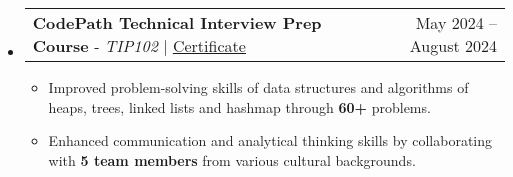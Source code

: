 \documentclass[letterpaper,11pt]{article}
\makeatletter
\newcommand{\resumeItem}[1]{
  \item\small{
    {#1 \vspace{-1pt}}
  }
}
\newcommand{\resumeProjectHeading}[2]{
    \item
    \begin{tabular*}{0.985\textwidth}{l@{\extracolsep{\fill}}r@{\hspace{-0.1in}}}
        \small#1 & \small#2 \\
    \end{tabular*}\vspace{-3pt}
}
\newcommand{\resumeSubHeadingListStart}{\begin{itemize}[leftmargin=0.00in, rightmargin=-0.2in, label={}]}
\newcommand{\resumeSubHeadingListEnd}{\end{itemize}\vspace{-9pt}}
\newcommand{\resumeItemListStart}{\begin{itemize}[leftmargin=0.15in, rightmargin=0.15in]}
\newcommand{\resumeItemListEnd}{\end{itemize}\vspace{-3pt}}
\makeatother
\begin{document}
\resumeSubHeadingListStart
\resumeProjectHeading
{\textbf{CodePath Technical Interview Prep Course} - \emph{TIP102} $|$ \href{https://drive.google.com/file/d/1AF2ZAUXoXeakbAZIJZ_izQ2nd9aNfjYB/view?usp=sharing}{\underline{Certificate}}}{May 2024 -- August 2024}
\resumeItemListStart
\resumeItem{Improved problem-solving skills of data structures and algorithms of heaps, trees, linked lists and hashmap through \textbf{60+} problems.}
\resumeItem{Enhanced communication and analytical thinking skills by collaborating with \textbf{5 team members} from various cultural backgrounds.}
\resumeItemListEnd
\resumeSubHeadingListEnd

\end{document}
